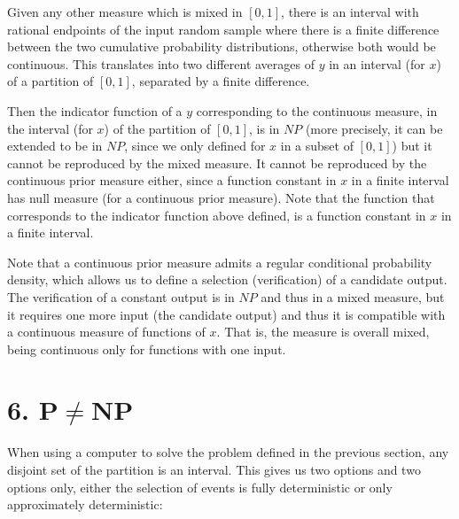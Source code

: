 \documentclass[11pt,a4paper]{report}
\begin{document}
Given any other measure which is mixed in \([0,1]\), there is an
interval with rational endpoints of the input random sample where there
is a finite difference between the two cumulative probability
distributions, otherwise both would be continuous. This translates into
two different averages of \(y\) in an interval (for \(x\)) of a
partition of \([0,1]\), separated by a finite difference.

Then the indicator function of a \(y\) corresponding to the continuous
measure, in the interval (for \(x\)) of the partition of \([0,1]\), is
in \(NP\) (more precisely, it can be extended to be in \(NP\), since we
only defined for \(x\) in a subset of \([0,1]\)) but it cannot be
reproduced by the mixed measure. It cannot be reproduced by the
continuous prior measure either, since a function constant in \(x\) in a
finite interval has null measure (for a continuous prior measure). Note
that the function that corresponds to the indicator function above
defined, is a function constant in \(x\) in a finite interval.

Note that a continuous prior measure admits a regular conditional
probability density, which allows us to define a selection
(verification) of a candidate output. The verification of a constant
output is in \(NP\) and thus in a mixed measure, but it requires one
more input (the candidate output) and thus it is compatible with a
continuous measure of functions of \(x\). That is, the measure is
overall mixed, being continuous only for functions with one input.

\hypertarget{pneqnp}{%
\section{\texorpdfstring{6.
P\(\neq\)NP}{6. P\textbackslash neqNP}}\label{pneqnp}}

When using a computer to solve the problem defined in the previous
section, any disjoint set of the partition is an interval. This gives us
two options and two options only, either the selection of events is
fully deterministic or only approximately deterministic:
\end{document}
